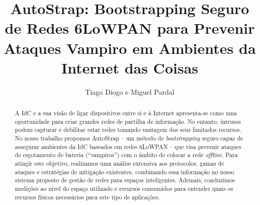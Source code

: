 \documentclass{llncs}
\begin{document}
\title{AutoStrap: Bootstrapping Seguro de Redes 6LoWPAN para Prevenir Ataques Vampiro em Ambientes da Internet das Coisas}
%
%
\author{Tiago Diogo e Miguel Pardal}
%
%
%

\maketitle              %

\begin{abstract}
A \ac{IdC} e a sua visão de ligar dispositivos entre si e à Internet apresenta-se como uma oportunidade para criar grandes redes de partilha de informação. No entanto, intrusos podem capturar e debilitar estar redes tomando vantagem dos seus limitados recursos. No nosso trabalho propomos AutoStrap -- um método de \textit{bootstrapping} seguro capaz de assegurar ambientes da \ac{IdC} baseados em redes 6LoWPAN -- que visa prevenir ataques de esgotamento de bateria (``vampiros'') com o âmbito de colocar a rede \textit{offline}. Para atingir este objetivo, realizamos uma análise extensiva aos protocolos, gamas de ataques e estratégias de mitigação existentes, combinando essa informação no nosso sistema proposto de gestão de redes para espaços inteligentes. Ademais, conduzimos medições ao nível do espaço utilizado e recursos consumidos para entender quais os recursos físicos necessários para este tipo de aplicações.
\end{abstract}
\end{document}
